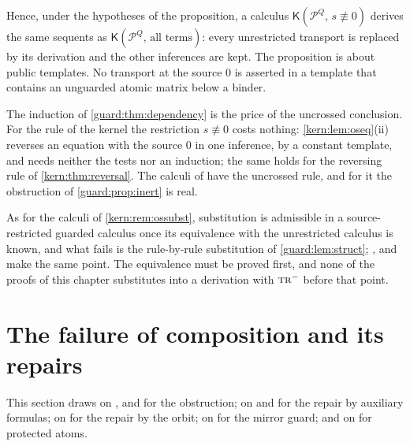Hence, under the hypotheses of the proposition, a calculus
$\mathsf K(\mathcal P^{Q},\,s\not\equiv 0)$ derives the same sequents as
$\mathsf K(\mathcal P^{Q},\,\text{all terms})$: every unrestricted transport
is replaced by its derivation and the other inferences are kept.  The
proposition is about public templates.  No transport at the source $0$ is
asserted in a template that contains an unguarded atomic matrix below a
binder.

\begin{remark}
\label{guard:rem:crossed}
The induction of \cref{guard:thm:dependency} is the price of the uncrossed
conclusion.  For the rule  of the kernel the restriction
$s\not\equiv 0$ costs nothing: \cref{kern:lem:oseq}(ii) reverses an
equation with the source $0$ in one inference, by a constant template, and
needs neither the tests nor an induction; the same holds for the reversing
rule of \cref{kern:thm:reversal}.  The calculi of
 have the uncrossed
rule, and for it the obstruction of \cref{guard:prop:inert} is real.
\end{remark}

\begin{remark}
\label{guard:rem:substwording}
As for the calculi of \cref{kern:rem:ossubst}, substitution is admissible
in a source-restricted guarded calculus once its equivalence with the
unrestricted calculus is known, and what fails is the rule-by-rule
substitution of \cref{guard:lem:struct}; ,
 and  make the same point.  The
equivalence must be proved first, and none of the proofs of this chapter
substitutes into a derivation with $\rulename{Tr}^{-}$ before that point.
\end{remark}

\section{The failure of composition and its repairs}
\label{guard:sec:composition}

This section draws on ,  and
 for the obstruction; on 
and  for the repair by auxiliary formulas; on
 for the repair by the orbit; on  for
the mirror guard; and on  for protected atoms.

